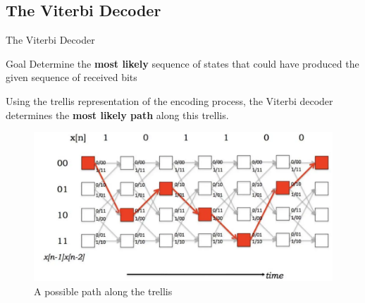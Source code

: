 \documentclass{beamer}
\newcommand{\<}				{\langle}
\renewcommand{\>}      		{\rangle}
\begin{document}



\subsection{The Viterbi Decoder} 

\begin{frame}{The Viterbi Decoder}

\begin{block}{Goal}
Determine the \textbf{most likely} sequence of states that could have produced the given sequence of received bits
\end{block}

Using the trellis representation of the encoding process, the Viterbi decoder determines the \textbf{most likely path} along this trellis.

\begin{figure}[h]
\includegraphics[scale=0.2]{viterbi.png}
\caption{A possible path along the trellis}
\end{figure}





\end{frame}
\end{document}

